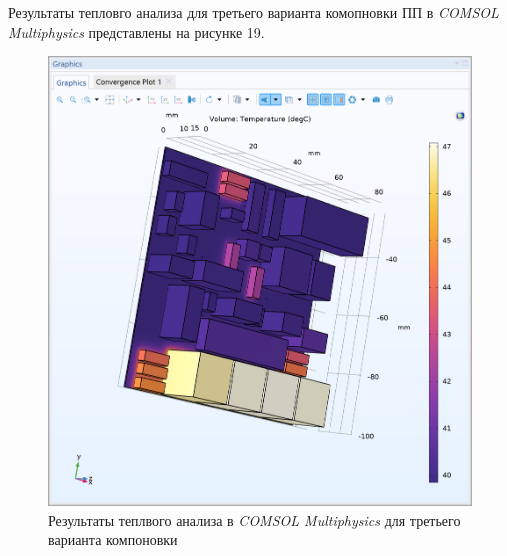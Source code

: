 Результаты тепловго анализа для третьего варианта комопновки ПП в
\textit{COMSOL Multiphysics} представлены на рисунке 19.
\begin{figure}[H]
  \centering
  \includegraphics[scale=0.5]{../img/scrot/Screenshot-2024-05-16-024105.png}
  \caption{Результаты теплвого анализа в \textit{COMSOL Multiphysics}
  для третьего варианта компоновки}

\end{figure}

